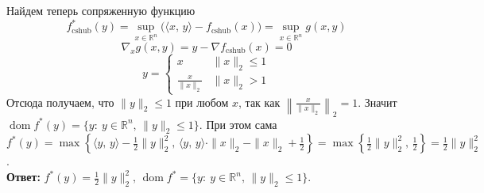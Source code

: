 \documentclass{article}
\DeclareMathOperator{\dom}{dom}
\newcommand*{\R}{\mathbb{R}}
\begin{document}
Найдем теперь сопряженную функцию
\[ f_{\text{cshub}}^\ast(y) = \sup\limits_{x \in \R^n} \! \big( \langle x,\, y \rangle - f_{\text{cshub}}(x) \big) = \sup\limits_{x \in \R^n} g(x, y) \]
\[ \nabla_x g(x, y) = y - \nabla f_{\text{cshub}}(x) = 0 \]
\[ y = \begin{cases}
    x & \|x\|_2 \leqslant 1 \\
    \frac{x}{\|x\|_2} & \|x\|_2 > 1
\end{cases} \]
Отсюда получаем, что $ \| y \|_2 \leqslant 1 $ при любом $x$, так как $\left\| \frac{x}{\|x\|_2} \right\|_2 = 1$. Значит $\dom f^\ast(y) = \{ y :\: y \in \R^n,\, \|y\|_2 \leqslant 1 \} $. При этом сама $f^\ast(y) = \max\left\{ \langle y,\, y \rangle - \frac12 \|y\|_2^2,\, \langle y,\, y \rangle \cdot \|x\|_2 - \|x\|_2 + \frac12 \right\} = \max\left\{ \frac12 \|y\|_2^2,\, \frac12 \right\} = \frac12 \|y\|_2^2 $. \\
\textbf{Ответ:} $f^\ast(y) = \frac12 \|y\|_2^2,\, \dom f^\ast = \{ y :\: y \in \R^n,\, \|y\|_2 \leqslant 1 \} $.
\end{document}
